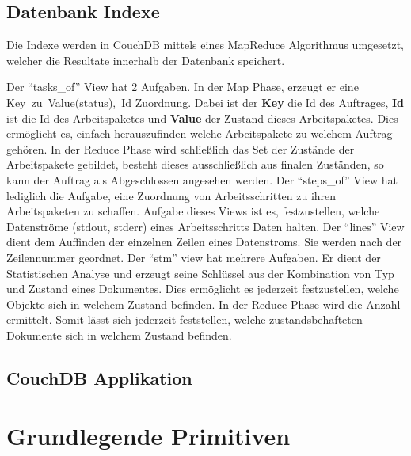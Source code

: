 \subsection{Datenbank Indexe}

Die Indexe werden in CouchDB mittels 
eines MapReduce \cite{couchdb:views} Algorithmus umgesetzt,
welcher die Resultate innerhalb der Datenbank speichert.

\begin{description}
    \dhitem[tasks\_of]
        Der ``tasks\_of'' View hat 2 Aufgaben.
        In der Map Phase, erzeugt er eine \hbox{Key zu Value(status), Id} Zuordnung.
        Dabei ist der \textbf{Key} die Id des Auftrages,
        \textbf{Id} ist die Id des Arbeitspaketes
        und \textbf{Value} der Zustand dieses Arbeitspaketes.
        Dies ermöglicht es, einfach herauszufinden
        welche Arbeitspakete zu welchem Auftrag gehören.
        In der Reduce Phase wird schließlich das Set
        der Zustände der Arbeitspakete gebildet,
        besteht dieses ausschließlich aus finalen Zuständen,
        so kann der Auftrag als Abgeschlossen angesehen werden.
    \dhitem[steps\_of]
        Der ``steps\_of'' View hat lediglich die Aufgabe,
        eine Zuordnung von Arbeitsschritten
        zu ihren Arbeitspaketen zu schaffen.
    \dhitem[streams]
        Aufgabe dieses Views ist es,
        festzustellen, welche Datenströme (stdout, stderr)
        eines Arbeitsschritts Daten halten.
    \dhitem[lines]
        Der ``lines'' View dient dem Auffinden der einzelnen Zeilen
        eines Datenstroms. Sie werden nach der Zeilennummer geordnet.
    \dhitem[stm]
        Der ``stm'' view hat mehrere Aufgaben.
        Er dient der Statistischen Analyse und
        erzeugt seine Schlüssel aus der Kombination
        von Typ und Zustand eines Dokumentes.
        Dies ermöglicht es jederzeit festzustellen,
        welche Objekte sich in welchem Zustand befinden.
        In der Reduce Phase wird die Anzahl ermittelt.
        Somit lässt sich jederzeit feststellen,
        welche zustandsbehafteten Dokumente
        sich in welchem Zustand befinden.
\end{description}

\subsection{CouchDB Applikation}

\section{Grundlegende Primitiven}


